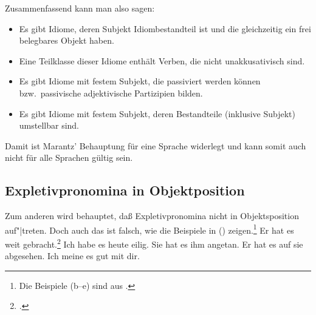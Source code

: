 Zusammenfassend kann man also sagen:
\begin{itemize}
\item Es gibt Idiome, deren Subjekt Idiombestandteil ist und die gleichzeitig ein frei belegbares Objekt haben.
\item Eine Teilklasse dieser Idiome enthält Verben, die nicht unakkusativisch sind.
\item Es gibt Idiome mit festem Subjekt, die passiviert werden können bzw.\ passivische adjektivische Partizipien bilden.
\item Es gibt Idiome mit festem Subjekt, deren Bestandteile (inklusive Subjekt) umstellbar sind.
\end{itemize}
Damit ist Marantz' Behauptung für eine Sprache widerlegt und kann somit auch nicht für alle Sprachen gültig sein.

\subsection{Expletivpronomina in Objektposition}
\label{sec-expletivum-in-obj-position}

%
Zum anderen wird behauptet, daß Expletivpronomina nicht in Objektsposition auf"|treten.
Doch auch das
ist falsch, wie die Beispiele in () zeigen.\footnote{
  Die Beispiele (b--e) sind aus .
}
\eal
\ex Er hat es weit gebracht.\footnote{
        .
}
\ex Ich habe es heute eilig.
\ex Sie hat es ihm angetan.
\ex Er hat es auf sie abgesehen.
\ex Ich meine es gut mit dir.
\zl


